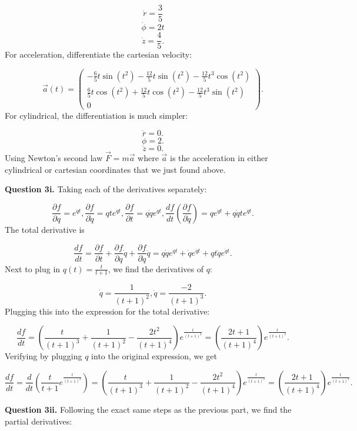 \documentclass[letterpaper, reqno,11pt]{article}
\begin{document}
\[
\dot r=\frac{3}{5}
\]
\[
\dot \phi = 2t
\]
\[
\dot z=\frac{4}{5}
.\]
For acceleration, differentiate the cartesian velocity: 

\[
\vec a(t)=\begin{pmatrix} -\frac{6}{5}t\sin(t^2)-\frac{12}{5}t \sin(t^2)-\frac{12}{5}t^3 \cos(t^2) \\ \frac{6}{5}t\cos(t^2)+\frac{12}{5}t \cos(t^2)-\frac{12}{5}t^3 \sin(t^2) \\ 0 \end{pmatrix}
.\]
For cylindrical, the differentiation is much simpler: 

\[
\ddot r=0
.\]
\[
\ddot\phi = 2
.\]
\[
\ddot z = 0
.\]
Using Newton's second law $\vec F=m\vec a$ where $\vec a$ is the acceleration in either cylindrical or cartesian coordinates that we just found above. 

{\noindent\bf Question 3i.} Taking each of the derivatives separately: 

\[
    \frac{\partial f}{\partial q} =e^{\dot q t}, \frac{\partial f}{\partial \dot q}=qte^{\dot qt},\frac{\partial f}{\partial t} =q\dot qe^{\dot qt}, \frac{df}{dt}\left( \frac{\partial f}{\partial \dot q}  \right) =qe^{\dot qt}+q\dot qte^{\dot qt}
.\]
The total derivative is 

\[
\frac{df}{dt}=\frac{\partial f}{\partial t} +\frac{\partial f}{\partial q} \dot q+\frac{\partial f}{\partial \dot q} \ddot q=q\dot qe^{\dot qt}+\dot qe^{\dot q t}+qt\ddot qe^{\dot qt}
.\]
Next to plug in $q(t)=\frac{t}{t+1}$, we find the derivatives of $ q$: 

\[
\dot q=\frac{1}{(t+1)^2}, \ddot q=\frac{-2}{(t+1)^3}
.\]
Plugging this into the expression for the total derivative: 

\[
\frac{df}{dt}=\left(\frac{t}{(t+1)^3}+\frac{1}{(t+1)^2}-\frac{2t^2}{(t+1)^4}\right)e^{\frac{t}{(t+1)^2}}=\left( \frac{2t+1}{(t+1)^4} \right) e^{\frac{t}{(t+1)^2}}
.\]
Verifying by plugging $q$ into the original expression, we get 

\[
\frac{df}{dt}=\frac{d}{dt}\left( \frac{t}{t+1}e^{\frac{t}{(t+1)^2}} \right)=\left(\frac{t}{(t+1)^3}+\frac{1}{(t+1)^2}-\frac{2t^2}{(t+1)^4}\right)e^{\frac{t}{(t+1)^2}}=\left( \frac{2t+1}{(t+1)^4} \right) e^{\frac{t}{(t+1)^2}}
.\]

{\noindent\bf Question 3ii.} Following the exact same steps as the previous part, we find the partial derivatives: 
\end{document}
